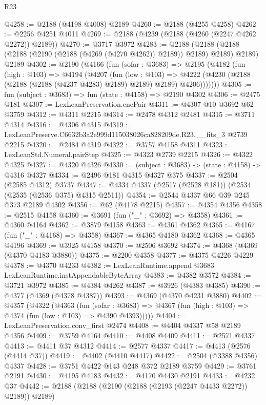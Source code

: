 \begin{lexlean}{R23}
\begin{coremodule}
@4258 := @2188 (@4198 @4008) @2189
@4260 := @2188 (@4255 @4258)
@4262 := @2256 @4251 @4011
@4269 := @2188 (@4239 (@2188 (@4260 (@2247 @4262 @2272)) @2189))
@4270 := @3717 @3972
@4283 := @2188
    (@2188 (@2188 (@2188 (@2190 (@2188 (@4269 (@4270 @4262)) @2189)) @2189) @2189) @2189)
    @2189
@4302 := @2190
    (@4166
      (fun (sofar : @3683) =>
      @2195
        (@4182
          (fun (high : @103) =>
          @4194
            (@4207
              (fun (low : @103) =>
              @4222 (@4230 (@2188 (@2188 (@2188 (@4237 @4283) @2189) @2189) @2189) @4206)))))))
@4305 := fun (subject : @3683) => fun (state : @4158) => @2190 @4302
@4306 := @2475 @181
@4307 := LexLeanPreservation.encPair
@4311 := @4307 @10 @3692 @62 @3759
@4312 := @4311 @2215
@4314 := @2478 @4312 @2481
@4315 := @3711 @4314
@4316 := @4306 @4315
@4319 := LexLeanPreserve.C6632b3a2e999d115038026ca828209de.R23.__fits_3 @2739 @2215
@4320 := @2484 @4319
@4322 := @3757 @4158 @4311
@4323 := LexLeanStd.Numeral.pairStep
@4325 := @4323 @2739 @2215
@4326 := @4322 @4325
@4327 := @4320 @4326
@4330 := (subject : @3683) -> (state : @4158) -> @4316 @4327
@4334 := @2496 @181 @4315 @4327 @375
@4337 := @2504 (@2585 @4312) @3737
@4347 := @4334 @4337 (@2517 (@2528 @181)) (@2534 (@2535 (@2536 @375) @4315 @2511))
@4354 := @2544 @4337 @66 @39 @245 @373 @2189 @4302
@4356 := @62 (@4178 @2215)
@4357 := @4354 @4356
@4358 := @2515 @4158
@4360 := @3691 (fun ("_" : @3692) => @4358)
@4361 := @4360 @4164
@4362 := @3879 @4158
@4363 := @4361 @4362
@4365 := @4167 (fun ("_" : @4168) => @4358)
@4367 := @4365 @4180 @4362
@4368 := @4365 @4196
@4369 := @3925 @4158
@4370 := @2506 @3692
@4374 := @4368 (@4369 (@4370 @4183 @3880))
@4375 := @2200 @4358
@4377 := @4375 @4226 @4229
@4378 := @4370 @4233
@4382 := LexLeanRuntime.append @3683 LexLeanRuntime.instAppendableByteArray
@4383 := @4382 @3572
@4384 := @3721 @3972
@4385 := @4384 @4262
@4387 := @3926 (@4383 @4385)
@4390 := @4377 (@4369 (@4378 @4387))
@4393 := @4369 (@4370 @4231 @3880)
@4402 := @4357
    (@4322
      (@4363
        (fun (sofar : @3683) =>
        @4367 (fun (high : @103) => @4374 (fun (low : @103) => @4390 @4393)))))
@4404 := LexLeanPreservation.conv_first @2474
@4408 := @4404 @4337 @58 @2189 @4356
@4409 := @3759 @4164
@4410 := @4408 @4409
@4411 := @2571 @4337
@4413 := @4411 @37 @4312
@4414 := @2577 @4337
@4417 := @4413 (@2576 (@4414 @37))
@4419 := @4402 (@4410 @4417)
@4422 := @2504 (@3388 @4356) @4337
@4428 := @3751 @4422 @143 @248 @372 @2189 @3759
@4429 := @3761 @2191
@4430 := @4195 @4183
@4432 := @4170 @4430 @2191
@4433 := @4232 @37
@4442 := @2188 (@2188 (@2190 (@2188 (@2193 (@2247 @4433 @2272)) @2189)) @2189)

\end{coremodule}
\end{lexlean}
